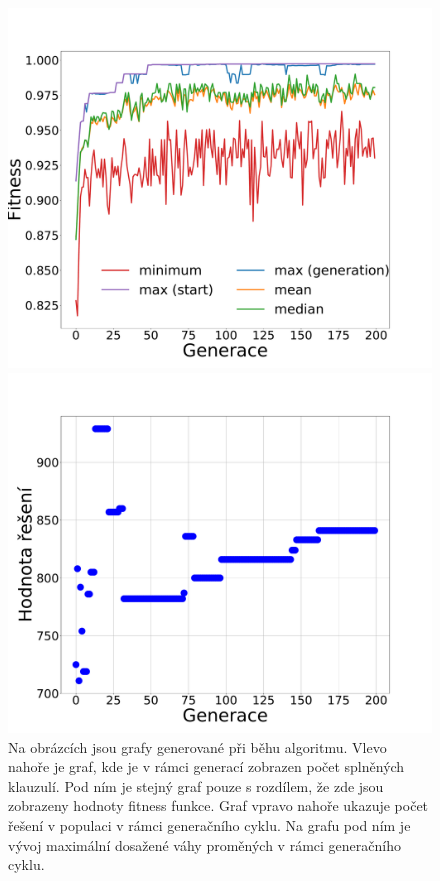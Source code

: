 \documentclass[11pt]{article}
\begin{document}
\begin{figure}
    \begin{minipage}[c]{0.48\textwidth}
        \centering \includegraphics[width=\textwidth]{img/runG.pdf} 
    \end{minipage}
    \begin{minipage}[c]{0.48\textwidth}
        \centering \includegraphics[width=\textwidth]{img/runW.pdf} 
    \end{minipage}
   \caption{Na obrázcích jsou grafy generované při běhu algoritmu. Vlevo nahoře je graf, kde je v rámci generací zobrazen počet splněných klauzulí. Pod ním je stejný graf pouze s rozdílem, že zde jsou zobrazeny hodnoty fitness funkce. Graf vpravo nahoře ukazuje počet řešení v populaci v rámci generačního cyklu. Na grafu pod ním je vývoj maximální dosažené váhy proměných v rámci generačního cyklu.}\label{fig:normalrun}
\end{figure} 
\end{document}
